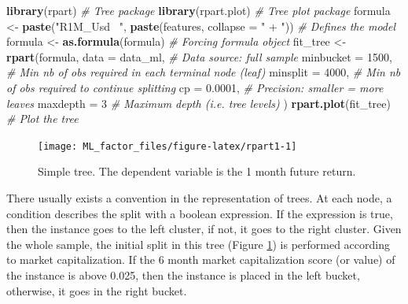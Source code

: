 \documentclass[]{krantz}
\makeatletter
\newenvironment{Shaded}{\begin{snugshade}}{\end{snugshade}}
\newcommand{\CommentTok}[1]{\textcolor[rgb]{0.37,0.37,0.37}{\textit{#1}}}
\newcommand{\DataTypeTok}[1]{\textcolor[rgb]{0.27,0.27,0.27}{#1}}
\newcommand{\DecValTok}[1]{\textcolor[rgb]{0.06,0.06,0.06}{#1}}
\newcommand{\FloatTok}[1]{\textcolor[rgb]{0.06,0.06,0.06}{#1}}
\newcommand{\KeywordTok}[1]{\textcolor[rgb]{0.27,0.27,0.27}{\textbf{#1}}}
\newcommand{\NormalTok}[1]{#1}
\newcommand{\StringTok}[1]{\textcolor[rgb]{0.5,0.5,0.5}{#1}}
\newenvironment{kframe}{%
\medskip{}
\setlength{\fboxsep}{.8em}
 \def\at@end@of@kframe{}%
 \ifinner\ifhmode%
  \def\at@end@of@kframe{\end{minipage}}%
  \begin{minipage}{\columnwidth}%
 \fi\fi%
 \def\FrameCommand##1{\hskip\@totalleftmargin \hskip-\fboxsep
 \colorbox{shadecolor}{##1}\hskip-\fboxsep
     \hskip-\linewidth \hskip-\@totalleftmargin \hskip\columnwidth}%
 \MakeFramed {\advance\hsize-\width
   \@totalleftmargin\z@ \linewidth\hsize
   \@setminipage}}%
 {\par\unskip\endMakeFramed%
 \at@end@of@kframe}
\renewenvironment{Shaded}{\begin{kframe}}{\end{kframe}}
\theoremstyle{definition}
\theoremstyle{definition}
\theoremstyle{definition}
\theoremstyle{remark}
\makeatother
\begin{document}
\begin{Shaded}
\begin{Highlighting}[]
\KeywordTok{library}\NormalTok{(rpart)              }\CommentTok{# Tree package }
\KeywordTok{library}\NormalTok{(rpart.plot)         }\CommentTok{# Tree plot package}
\NormalTok{formula <-}\StringTok{ }\KeywordTok{paste}\NormalTok{(}\StringTok{"R1M_Usd ~"}\NormalTok{, }\KeywordTok{paste}\NormalTok{(features, }\DataTypeTok{collapse =} \StringTok{" + "}\NormalTok{)) }\CommentTok{# Defines the model }
\NormalTok{formula <-}\StringTok{ }\KeywordTok{as.formula}\NormalTok{(formula)                                   }\CommentTok{# Forcing formula object}
\NormalTok{fit_tree <-}\StringTok{ }\KeywordTok{rpart}\NormalTok{(formula,}
             \DataTypeTok{data =}\NormalTok{ data_ml,     }\CommentTok{# Data source: full sample}
             \DataTypeTok{minbucket =} \DecValTok{1500}\NormalTok{,   }\CommentTok{# Min nb of obs required in each terminal node (leaf)}
             \DataTypeTok{minsplit =} \DecValTok{4000}\NormalTok{,    }\CommentTok{# Min nb of obs required to continue splitting}
             \DataTypeTok{cp =} \FloatTok{0.0001}\NormalTok{,        }\CommentTok{# Precision: smaller = more leaves}
             \DataTypeTok{maxdepth =} \DecValTok{3}        \CommentTok{# Maximum depth (i.e. tree levels)}
\NormalTok{             ) }
\KeywordTok{rpart.plot}\NormalTok{(fit_tree)             }\CommentTok{# Plot the tree}
\end{Highlighting}
\end{Shaded}

\begin{figure}[b]

{\centering \texttt{[image: ML\_factor\_files/figure-latex/rpart1-1]} 

}

\caption{Simple tree. The dependent variable is the 1 month future return.}\label{fig:rpart1}
\end{figure}

\normalsize

There usually exists a convention in the representation of trees. At
each node, a condition describes the split with a boolean expression. If
the expression is true, then the instance goes to the left cluster, if
not, it goes to the right cluster. Given the whole sample, the initial
split in this tree (Figure \ref{fig:rpart1}) is performed according to
market capitalization. If the 6 month market capitalization score (or
value) of the instance is above 0.025, then the instance is placed in
the left bucket, otherwise, it goes in the right bucket.
\end{document}
